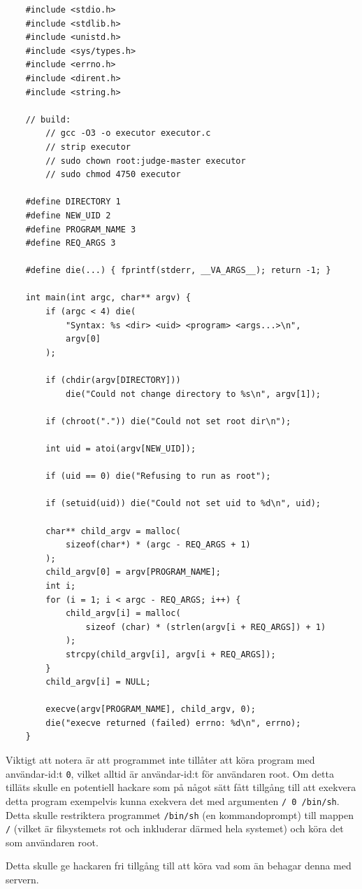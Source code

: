 \documentclass{article}
\begin{document}
\begin{verbatim}
	#include <stdio.h>
	#include <stdlib.h>
	#include <unistd.h>
	#include <sys/types.h>
	#include <errno.h>
	#include <dirent.h>
	#include <string.h>

	// build:
		// gcc -O3 -o executor executor.c
		// strip executor
		// sudo chown root:judge-master executor
		// sudo chmod 4750 executor

	#define DIRECTORY 1
	#define NEW_UID 2
	#define PROGRAM_NAME 3
	#define REQ_ARGS 3

	#define die(...) { fprintf(stderr, __VA_ARGS__); return -1; }

	int main(int argc, char** argv) {
		if (argc < 4) die(
			"Syntax: %s <dir> <uid> <program> <args...>\n",
			argv[0]
		);

		if (chdir(argv[DIRECTORY]))
			die("Could not change directory to %s\n", argv[1]);

		if (chroot(".")) die("Could not set root dir\n");

		int uid = atoi(argv[NEW_UID]);

		if (uid == 0) die("Refusing to run as root");

		if (setuid(uid)) die("Could not set uid to %d\n", uid);

		char** child_argv = malloc(
			sizeof(char*) * (argc - REQ_ARGS + 1)
		);
		child_argv[0] = argv[PROGRAM_NAME];
		int i;
		for (i = 1; i < argc - REQ_ARGS; i++) {
			child_argv[i] = malloc(
				sizeof (char) * (strlen(argv[i + REQ_ARGS]) + 1)
			);
			strcpy(child_argv[i], argv[i + REQ_ARGS]);
		}
		child_argv[i] = NULL;

		execve(argv[PROGRAM_NAME], child_argv, 0);
		die("execve returned (failed) errno: %d\n", errno);
	}
\end{verbatim}

Viktigt att notera är att programmet inte tillåter att köra program med
användar-id:t \texttt{0}, vilket alltid är användar-id:t för användaren root. Om
detta tilläts skulle en potentiell hackare som på något sätt fått tillgång till
att exekvera detta program exempelvis kunna exekvera det med argumenten
\texttt{/ 0 /bin/sh}. Detta skulle restriktera programmet \texttt{/bin/sh}
(en kommandoprompt) till mappen \texttt{/} (vilket är filsystemets rot och
inkluderar därmed hela systemet) och köra det som användaren root.

Detta skulle ge hackaren fri tillgång till att köra vad som än behagar denna med
servern.
\end{document}
